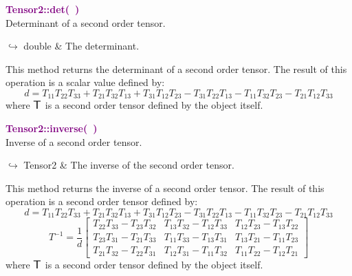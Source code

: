 \textcolor{purple}{\textbf{Tensor2::det(~)}}\label{Tensor2::det()}\\
Determinant of a second order tensor.\vspace*{-0.5em}
\begin{tcolorbox}[grow to left by=-1cm, width=\textwidth-1cm,myArgs,tabularx={l|R}]
$\hookrightarrow$ double & The determinant.
\end{tcolorbox}

This method returns the determinant of a second order tensor.
The result of this operation is a scalar value defined by:
\begin{equation*}
d = T_{11} T_{22} T_{33} + T_{21} T_{32} T_{13} + T_{31} T_{12} T_{23} - T_{31} T_{22} T_{13} - T_{11} T_{32} T_{23} - T_{21} T_{12} T_{33}
\end{equation*}
where $\mbox{\large\ensuremath{\mathsf{T}}}$ is a second order tensor defined by the object itself.

\textcolor{purple}{\textbf{Tensor2::inverse(~)}}\label{Tensor2::inverse()}\\
Inverse of a second order tensor.\vspace*{-0.5em}
\begin{tcolorbox}[grow to left by=-1cm, width=\textwidth-1cm,myArgs,tabularx={l|R}]
$\hookrightarrow$ Tensor2 & The inverse of the second order tensor.
\end{tcolorbox}

This method returns the inverse of a second order tensor.
The result of this operation is a second order tensor defined by:
\begin{equation*}
d = T_{11} T_{22} T_{33} + T_{21} T_{32} T_{13} + T_{31} T_{12} T_{23} - T_{31} T_{22} T_{13} - T_{11} T_{32} T_{23} - T_{21} T_{12} T_{33}
\end{equation*}
\begin{equation*}
T^{-1} = \frac {1}{d} \left[\begin{array}{ccc}
  T_{22}T_{33}-T_{23}T_{32}&T_{13}T_{32}-T_{12}T_{33}&T_{12}T_{23}-T_{13}T_{22}\\
  T_{23}T_{31}-T_{21}T_{33}&T_{11}T_{33}-T_{13}T_{31}&T_{13}T_{21}-T_{11}T_{23}\\
  T_{21}T_{32}-T_{22}T_{31}&T_{12}T_{31}-T_{11}T_{32}&T_{11}T_{22}-T_{12}T_{21}
  \end{array}
  \right]
\end{equation*}
where $\mbox{\large\ensuremath{\mathsf{T}}}$ is a second order tensor defined by the object itself.

